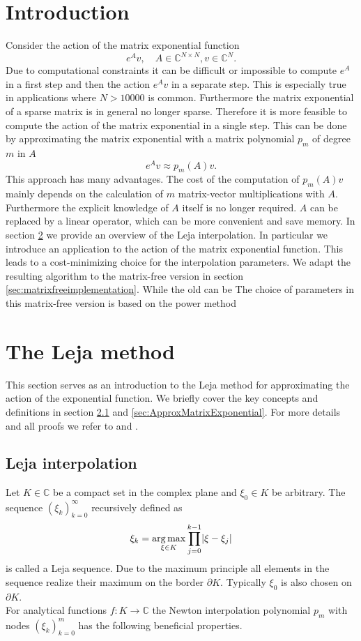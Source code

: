 \documentclass{scrartcl}
\begin{document}
	\section{Introduction}
	Consider the action of the matrix exponential function 
	\[e^Av,\quad A\in\mathbb{C}^{N\times N}, v\in\mathbb{C}^N.\] 
	Due to computational constraints it can be difficult or impossible to compute $e^A$ in a first step and then the action $e^Av$ in a separate step. This is especially true in applications where $N>10000$ is common. Furthermore the matrix exponential of a sparse matrix is in general no longer sparse. Therefore it is more feasible to compute the action of the matrix exponential in a single step. This can be done by approximating the matrix exponential with a matrix polynomial $p_m$ of degree $m$ in $A$
	\[e^Av \approx p_m(A)v.\]
	This approach has many advantages. The cost of the computation of $p_m(A)v$ mainly depends on the calculation of $m$ matrix-vector multiplications with $A$. Furthermore the explicit knowledge of $A$ itself is no longer required. $A$ can be replaced by a linear operator, which can be more convenient and save memory.
	In section \ref{sec:LejaMethod} we provide an overview of the Leja interpolation. In particular we introduce an application to the action of the matrix exponential function. This leads to a cost-minimizing choice for the interpolation parameters.
	We adapt the resulting algorithm to the matrix-free version in section \ref{sec:matrixfreeimplementation}. While the old can be  The choice of parameters in this matrix-free version is based on the power method
	
	\section{The Leja method} \label{sec:LejaMethod}
	This section serves as an introduction to the Leja method for approximating the action of the exponential function. We briefly cover the key concepts and definitions in section \ref{sec:LejaInterpolation} and \ref{sec:ApproxMatrixExponential}. For more details and all proofs we refer to \cite{advdif} and \cite{lejarev}. 
	
	\subsection{Leja interpolation} \label{sec:LejaInterpolation}
	Let $K\in\mathbb{C}$ be a compact set in the complex plane and $\xi_0\in K$ be arbitrary. The sequence $(\xi_k)_{k=0}^{\infty}$ recursively defined as
	\[\xi_k = \underset{{\xi\in K}}{\operatorname{arg\,max}}\displaystyle\prod_{j=0}^{k-1}\lvert\xi-\xi_j\rvert\]
	is called a Leja sequence. Due to the maximum principle all elements in the sequence realize their maximum on the border $\partial K$. Typically $\xi_0$ is also chosen on $\partial K$.\\
	For analytical functions $f\!:K\to\mathbb{C}$ the Newton interpolation polynomial $p_m$ with nodes $(\xi_k)_{k=0}^{m}$ has the following beneficial properties. 
\end{document}
